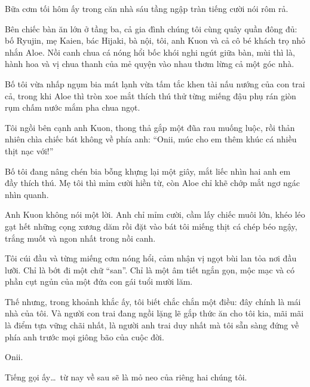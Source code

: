 ﻿\documentclass[../main.tex]{subfiles}
\begin{document}
\ct

Bữa cơm tối hôm ấy trong căn nhà sáu tầng ngập tràn tiếng cười nói rôm rả.

Bên chiếc bàn ăn lớn ở tầng ba, cả gia đình chúng tôi cùng quây quần đông đủ: bố Ryujin, mẹ Kaien, bác Hijaki, bà nội, tôi, anh Kuon và cả cô bé khách trọ nhỏ nhắn Aloe. Nồi canh chua cá nóng hổi bốc khói nghi ngút giữa bàn, mùi thì là, hành hoa và vị chua thanh của mẻ quyện vào nhau thơm lừng cả một góc nhà.

Bố tôi vừa nhấp ngụm bia mát lạnh vừa tấm tắc khen tài nấu nướng của con trai cả, trong khi Aloe thì tròn xoe mắt thích thú thử từng miếng đậu phụ rán giòn rụm chấm nước mắm pha chua ngọt.

Tôi ngồi bên cạnh anh Kuon, thong thả gắp một đũa rau muống luộc, rồi thản nhiên chìa chiếc bát không về phía anh: ``Onii, múc cho em thêm khúc cá nhiều thịt nạc với!''

Bố tôi đang nâng chén bia bỗng khựng lại một giây, mắt liếc nhìn hai anh em đầy thích thú. Mẹ tôi thì mỉm cười hiền từ, còn Aloe chỉ khẽ chớp mắt ngơ ngác nhìn quanh.

Anh Kuon không nói một lời. Anh chỉ mỉm cười, cầm lấy chiếc muôi lớn, khéo léo gạt hết những cọng xương dăm rồi đặt vào bát tôi miếng thịt cá chép béo ngậy, trắng muốt và ngon nhất trong nồi canh.

Tôi cúi đầu và từng miếng cơm nóng hổi, cảm nhận vị ngọt bùi lan tỏa nơi đầu lưỡi. Chỉ là bớt đi một chữ ``san''. Chỉ là một âm tiết ngắn gọn, mộc mạc và có phần cụt ngủn của một đứa con gái tuổi mười lăm.

Thế nhưng, trong khoảnh khắc ấy, tôi biết chắc chắn một điều: đây chính là mái nhà của tôi. Và người con trai đang ngồi lặng lẽ gắp thức ăn cho tôi kia, mãi mãi là điểm tựa vững chãi nhất, là người anh trai duy nhất mà tôi sẵn sàng đứng về phía anh trước mọi giông bão của cuộc đời.

Onii.

Tiếng gọi ấy\dots\ từ nay về sau sẽ là mỏ neo của riêng hai chúng tôi.
\end{document}

